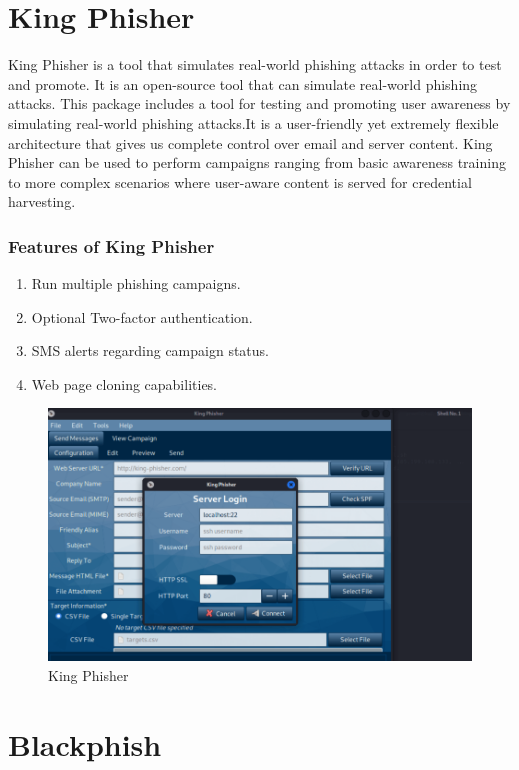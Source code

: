 \documentclass[openany]{report}
\begin{document}
\section{King Phisher}

King Phisher is a tool that simulates real-world phishing attacks in order to test and promote. It is an open-source tool that can simulate real-world phishing attacks. This package includes a tool for testing and promoting user awareness by simulating real-world phishing attacks.It is a user-friendly yet extremely flexible architecture that gives us complete control over email and server content. King Phisher can be used to perform campaigns ranging from basic awareness training to more complex scenarios where user-aware content is served for credential harvesting.

\subsubsection{Features of King Phisher}
\begin{enumerate}
    \item Run multiple phishing campaigns.
    \item Optional Two-factor authentication.
    \item SMS alerts regarding campaign status.
    \item Web page cloning capabilities.
\end{enumerate}

\begin{figure}[H]
    \centering
    \includegraphics[width=.95\textwidth]{kingphisher.png}
    \caption{King Phisher}
    \label{fig:kingphisher}
\end{figure}

\section{Blackphish}
\end{document}

